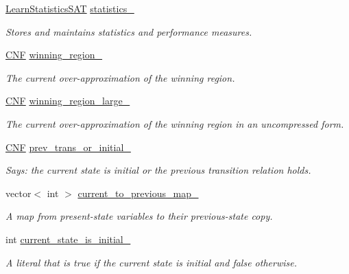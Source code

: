 \begin{DoxyCompactItemize}
\item 
\hyperlink{classLearnStatisticsSAT}{Learn\-Statistics\-S\-A\-T} \hyperlink{classLearnSynthSAT_a2175c687276e00fa0fe3e158680affc1}{statistics\-\_\-}
\begin{DoxyCompactList}\small\item\em Stores and maintains statistics and performance measures. \end{DoxyCompactList}\item 
\hyperlink{classCNF}{C\-N\-F} \hyperlink{classLearnSynthSAT_aced2bce789c7a93ed4b5391dd0690616}{winning\-\_\-region\-\_\-}
\begin{DoxyCompactList}\small\item\em The current over-\/approximation of the winning region. \end{DoxyCompactList}\item 
\hyperlink{classCNF}{C\-N\-F} \hyperlink{classLearnSynthSAT_aaa79e8772e9ce8e59dc14e3bb1784256}{winning\-\_\-region\-\_\-large\-\_\-}
\begin{DoxyCompactList}\small\item\em The current over-\/approximation of the winning region in an uncompressed form. \end{DoxyCompactList}\item 
\hyperlink{classCNF}{C\-N\-F} \hyperlink{classLearnSynthSAT_a6289a4f041ca85ce44a33143fab42888}{prev\-\_\-trans\-\_\-or\-\_\-initial\-\_\-}
\begin{DoxyCompactList}\small\item\em Says\-: the current state is initial or the previous transition relation holds. \end{DoxyCompactList}\item 
vector$<$ int $>$ \hyperlink{classLearnSynthSAT_a98f676db61a949cd9c9626e165f378a4}{current\-\_\-to\-\_\-previous\-\_\-map\-\_\-}
\begin{DoxyCompactList}\small\item\em A map from present-\/state variables to their previous-\/state copy. \end{DoxyCompactList}\item 
int \hyperlink{classLearnSynthSAT_ace0511849ad0020364743f54dd75afee}{current\-\_\-state\-\_\-is\-\_\-initial\-\_\-}
\begin{DoxyCompactList}\small\item\em A literal that is true if the current state is initial and false otherwise. \end{DoxyCompactList}\item 

\end{DoxyCompactItemize}
